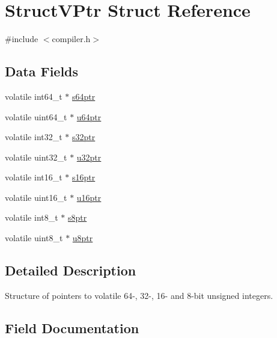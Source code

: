 \hypertarget{struct_struct_v_ptr}{}\section{Struct\+V\+Ptr Struct Reference}
\label{struct_struct_v_ptr}


{\ttfamily \#include $<$compiler.\+h$>$}

\subsection*{Data Fields}
\begin{DoxyCompactItemize}
\item 
volatile int64\+\_\+t $\ast$ \mbox{\hyperlink{struct_struct_v_ptr_a2908c8cb1c7d816d7f9d3a30531818f8}{s64ptr}}
\item 
volatile uint64\+\_\+t $\ast$ \mbox{\hyperlink{struct_struct_v_ptr_a1acc0e7be6320444fc9a35fbd89f1f37}{u64ptr}}
\item 
volatile int32\+\_\+t $\ast$ \mbox{\hyperlink{struct_struct_v_ptr_ac419cbdd704de7024e989caaf9e19a98}{s32ptr}}
\item 
volatile uint32\+\_\+t $\ast$ \mbox{\hyperlink{struct_struct_v_ptr_abdec22b9984813fac831e57d45cae742}{u32ptr}}
\item 
volatile int16\+\_\+t $\ast$ \mbox{\hyperlink{struct_struct_v_ptr_aee6c3ba77b4b25f556abb8a41053caf4}{s16ptr}}
\item 
volatile uint16\+\_\+t $\ast$ \mbox{\hyperlink{struct_struct_v_ptr_ae008948f89e2a5ee3102016f82023b42}{u16ptr}}
\item 
volatile int8\+\_\+t $\ast$ \mbox{\hyperlink{struct_struct_v_ptr_ab07ceff1caf6f3bb01bd31296a36daf9}{s8ptr}}
\item 
volatile uint8\+\_\+t $\ast$ \mbox{\hyperlink{struct_struct_v_ptr_a4213589251839cd1f42c3343c6cb9be9}{u8ptr}}
\end{DoxyCompactItemize}


\subsection{Detailed Description}
Structure of pointers to volatile 64-\/, 32-\/, 16-\/ and 8-\/bit unsigned integers. 

\subsection{Field Documentation}
\mbox{\label{struct_struct_v_ptr_aee6c3ba77b4b25f556abb8a41053caf4}} 
